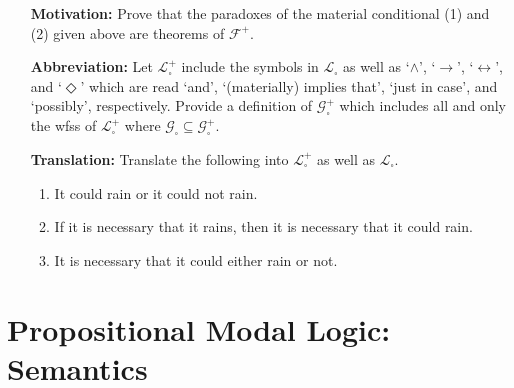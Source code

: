 \documentclass[a4paper, 11pt]{article} %
\begin{document}
\begin{enumerate}[leftmargin=1.2in,labelsep=.15in] 
\item[\bf Motivation:] Prove that the paradoxes of the material conditional (1) and (2) given above are theorems of $\mathcal{F}^+$.
\item[\bf Abbreviation:] Let $\mathcal{L}_\square^+$ include the symbols in $\mathcal{L}_\square$ as well as `$\wedge$', `$\rightarrow$', `$\leftrightarrow$', and `$\Diamond$' which are read `and', `(materially) implies that', `just in case', and `possibly', respectively. Provide a definition of $\mathcal{G}_\square^+$ which includes all and only the wfss of $\mathcal{L}_\square^+$ where $\mathcal{G}_\square\subseteq\mathcal{G}_\square^+$.
\item[\bf Translation:] Translate the following into $\mathcal{L}_\square^+$ as well as $\mathcal{L}_\square$.
	\begin{enumerate}[label=(\arabic*)]\small
	\item It could rain or it could not rain.
	\item If it is necessary that it rains, then it is necessary that it could rain.
	\item It is necessary that it could either rain or not.
	\end{enumerate}
\end{enumerate}



\section*{\sc Propositional Modal Logic: Semantics}
\end{document}
